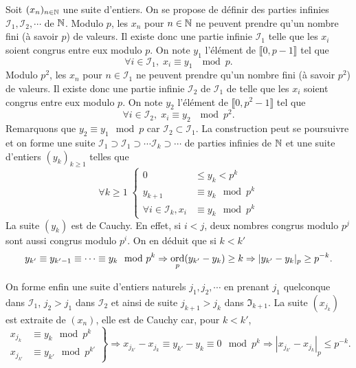 \begin{demo}
Soit $(x_n)_{n \in \mathbb{N}}$ une suite d'entiers. On se propose de définir des parties infinies $\mathcal{I}_1, \mathcal{I}_2, \cdots $ de $\mathbb{N}$.\newline
Modulo $p$, les $x_n$ pour $n\in \mathbb{N}$ ne peuvent prendre qu'un nombre fini (à savoir $p$) de valeurs. Il existe donc une partie infinie $\mathcal{I}_1$ telle que les $x_i$ soient congrus entre eux modulo $p$. On note $y_1$ l'élément de $\llbracket 0, p-1 \rrbracket$ tel que
\begin{displaymath}
 \forall i \in \mathcal{I}_1, \; x_i \equiv y_1 \;\mod p.
\end{displaymath}
Modulo $p^2$, les $x_n$ pour $n\in \mathcal{I}_1$ ne peuvent prendre qu'un nombre fini (à savoir $p^2$) de valeurs. Il existe donc une partie infinie $\mathcal{I}_2$ de $\mathcal{I}_1$ de telle que les $x_i$ soient congrus entre eux modulo $p$. On note $y_2$ l'élément de $\llbracket 0, p^2-1 \rrbracket$ tel que
\begin{displaymath}
 \forall i \in \mathcal{I}_2, \; x_i \equiv y_2 \;\mod p^2.
\end{displaymath}
Remarquons que $y_2 \equiv y_1 \mod p$ car $\mathcal{I}_2 \subset \mathcal{I}_1$.\newline
La construction peut se poursuivre et on forme une suite $\mathcal{I}_1 \supset \mathcal{I}_1 \supset \cdots \mathcal{I}_k \supset  \cdots$ de parties infinies de $\mathbb{N}$ et une suite d'entiers $(y_k)_{k\geq 1}$ telles que
\begin{displaymath}
\forall k \geq 1 \;
\left\lbrace
 \begin{aligned}
    0 &\leq y_k < p^k \\
   y_{k+1} &\equiv y_k \mod  p^k \\
   \forall i \in \mathcal{I}_k, x_i &\equiv y_k \mod  p^k
 \end{aligned}
 \right.
\end{displaymath}
La suite $(y_k)$ est de Cauchy. En effet, si $i<j$, deux nombres congrus modulo $p^j$ sont aussi congrus modulo $p^i$. On en déduit que si $k < k'$
\begin{displaymath}
 y_{k'} \equiv y_{k'-1} \equiv \cdots \equiv y_k \mod p^k
 \Rightarrow \mathop{\mathrm{ord}}_p (y_{k'} - y_k) \geq k \Rightarrow | y_{k'} - y_k|_p \geq p^{-k}.
\end{displaymath}

On forme enfin une suite d'entiers naturels $j_1, j_2, \cdots$ en prenant $j_1$ quelconque dans $\mathcal{I}_1$, $j_2 >j_1$ dans $\mathcal{I}_2$ et ainsi de suite $j_{k+1} > j_k$ dans $\mathfrak{I}_{k+1}$. La suite $(x_{j_k})$ est extraite de $(x_n)$, elle est de Cauchy car, pour $k < k'$,
\begin{displaymath}
 \left.
 \begin{aligned}
   x_{j_k} &\equiv y_k \mod p^k \\
   x_{j_{k'}} &\equiv y_{k'} \mod p^{k'}
 \end{aligned}
 \right\rbrace
 \Rightarrow
 x_{j_{k'}} - x_{j_{k}} \equiv y_{k'} -y_k \equiv 0 \mod p^k
 \Rightarrow
 |x_{j_{k'}} - x_{j_{k}} |_p \leq p^{-k}.
\end{displaymath}
\end{demo}


